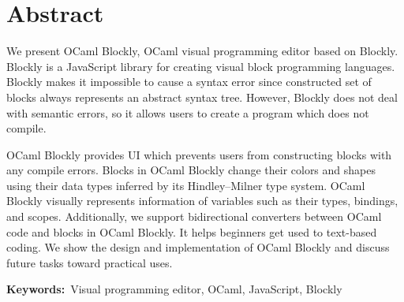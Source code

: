 \chapter*{Abstract}

We present OCaml Blockly, OCaml visual programming editor based on Blockly.
Blockly is a JavaScript library for creating visual block programming languages.
Blockly makes it impossible to cause a syntax error since constructed set of blocks always represents an abstract syntax tree.
However, Blockly does not deal with semantic errors, so it allows users to create a program which does not compile.

OCaml Blockly provides UI which prevents users from constructing blocks with any compile errors.
Blocks in OCaml Blockly change their colors and shapes using their data types inferred by its Hindley–Milner type system.
OCaml Blockly visually represents information of variables such as their types, bindings, and scopes.
Additionally, we support bidirectional converters between OCaml code and blocks in OCaml Blockly.
It helps beginners get used to text-based coding.
We show the design and implementation of OCaml Blockly and discuss future tasks toward practical uses.

{\bf Keywords:}\ Visual programming editor, OCaml, JavaScript, Blockly
